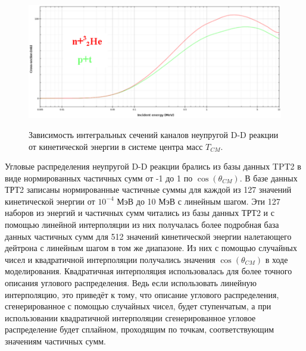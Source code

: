 \documentclass[a4paper,12pt]{article}
\begin{document}
\begin{large}
\begin{figure}[ht]
  {
     \includegraphics[width=0.99\linewidth]{images/DDInelasticIntegralCrossSections.pdf}
  }
  \caption{Зависимость интегральных сечений каналов неупругой D-D реакции от кинетической энергии в системе центра масс $T_{CM}$.}
  \label{fig:InelasticDDIntegralCrossSections}
\end{figure}	
	
	
	Угловые распределения неупругой D-D реакции брались из базы данных TPT2 в виде нормированных частичных сумм от -1 до 1 по $\cos{ \left( \theta_{CM} \right) }$.
	В базе данных ТРТ2 записаны нормированные частичные суммы для каждой из 127 значений кинетической энергии от $10^{-4}$ МэВ до 10 МэВ с линейным шагом.
	Эти 127 наборов из энергий и частичных сумм читались из базы данных ТРТ2 и с помощью линейной интерполяции из них получалась более подробная база данных частичных сумм для 512 значений кинетической энергии налетающего дейтрона с линейным шагом в том же диапазоне.
	Из них с помощью случайных чисел и квадратичной интерполяции получались значения $\cos{ \left( \theta_{CM} \right) }$ в ходе моделирования.
	Квадратичная интерполяция использовалась для более точного описания углового распределения.
	Ведь если использовать линейную интерполяцию, это приведёт к тому, что описание углового распределения, сгенерированное с помощью случайных чисел, будет ступенчатым, а при использовании квадратичной интерполяции сгенерированное угловое распределение будет сплайном, проходящим по точкам, соответствующим значениям частичных сумм.
	

\end{large}
\end{document}
